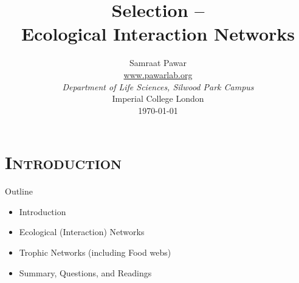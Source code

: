 




{
\begin{frame}[plain]

  \vspace{100pt}
  \title{\bf Selection -- \\Ecological Interaction Networks}

\author{
	Samraat Pawar\\
	\vspace{5pt}
	\url{www.pawarlab.org}\\
	\vspace{5pt}
	{\it  Department of Life Sciences, Silwood Park Campus}\\
Imperial College London\\
  \vspace{5pt}
\today
}
 
\titlepage
\date{} 

\end{frame}
}

\section{\scshape Introduction}

\begin{frame}{Outline}
  \begin{itemize}\setlength{\itemindent}{0em}\itemsep12pt

    \item Introduction

    \item Ecological (Interaction) Networks

    \item Trophic Networks (including Food webs)
    

    \item Summary, Questions, and Readings

  \end{itemize}  

\end{frame}

